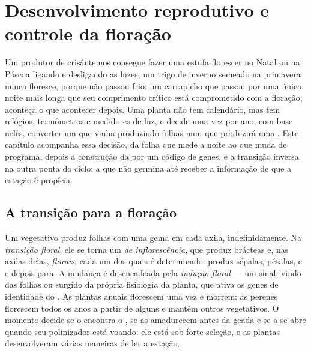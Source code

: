 \chapter{Desenvolvimento reprodutivo e controle da floração}\label{ch:b2:plant-flowering}

Um produtor de crisântemos consegue fazer uma estufa florescer no Natal
ou na Páscoa ligando e desligando as luzes; um trigo de inverno semeado
na primavera nunca floresce, porque não passou frio; um carrapicho que
passou por uma única noite mais longa que seu comprimento crítico está
comprometido com a floração, aconteça o que acontecer depois. Uma
planta não tem calendário, mas tem relógios, termômetros e medidores de
luz, e decide uma vez por ano, com base neles, converter um 
que vinha produzindo folhas num  que produzirá uma . Este
capítulo acompanha essa decisão, da folha que mede a noite ao
 que muda de programa, depois a construção da  por um
código de genes, e a transição inversa na outra ponta do ciclo: a
 que não germina até receber a informação de que a estação é
propícia.

\section{A transição para a floração}

\begin{definition}\label{def:b2:plant-flowering:transition}
Um  vegetativo produz folhas com uma gema em
cada axila, indefinidamente. Na \emph{transição floral}, ele se torna um
\emph{ de inflorescência}, que produz brácteas e, nas axilas
delas, \emph{ florais}, cada um dos quais é determinado:
produz sépalas, pétalas,  e  e depois para. A mudança é
desencadeada pela \emph{indução floral} --- um sinal, vindo das folhas
ou surgido da própria fisiologia da planta, que ativa os genes de
identidade do . As plantas anuais florescem uma vez e morrem;
as perenes florescem todos os anos a partir de alguns  e
mantêm outros vegetativos. O momento decide se o  encontra o
, se as  amadurecem antes da geada e se a  se abre
quando seu polinizador está voando: ele está sob forte seleção, e as
plantas desenvolveram várias maneiras de ler a estação.
\end{definition}


